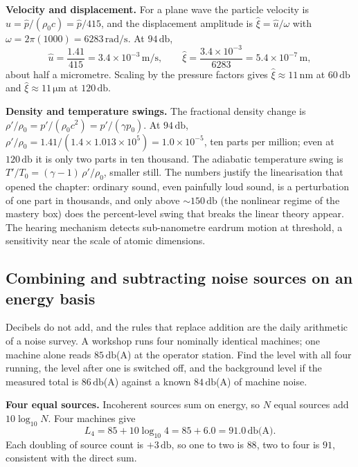\textbf{Velocity and displacement.} For a plane wave the particle velocity
is $\hat u = \hat p/(\rho_0 c) = \hat p/415$, and the displacement
amplitude is $\hat\xi = \hat u/\omega$ with $\omega = 2\pi(1000) =
6283\,\si{\radian\per\second}$. At $94\,\si{\decibel}$,
\[
\hat u = \frac{1.41}{415} = 3.4\times 10^{-3}\,\si{\meter\per\second},
\qquad
\hat\xi = \frac{3.4\times 10^{-3}}{6283} = 5.4\times 10^{-7}\,\si{\meter},
\]
about half a micrometre. Scaling by the pressure factors gives
$\hat\xi \approx 11\,\si{\nano\meter}$ at $60\,\si{\decibel}$ and
$\hat\xi \approx 11\,\si{\micro\meter}$ at $120\,\si{\decibel}$.

\textbf{Density and temperature swings.} The fractional density change is
$\rho'/\rho_0 = p'/(\rho_0 c^2) = p'/(\gamma p_0)$. At $94\,\si{\decibel}$,
$\rho'/\rho_0 = 1.41/(1.4\times 1.013\times 10^5) = 1.0\times 10^{-5}$, ten
parts per million; even at $120\,\si{\decibel}$ it is only two parts in ten
thousand. The adiabatic temperature swing is
$T'/T_0 = (\gamma-1)\,\rho'/\rho_0$, smaller still. The numbers justify the
linearisation that opened the chapter: ordinary sound, even painfully loud
sound, is a perturbation of one part in thousands, and only above
$\sim 150\,\si{\decibel}$ (the nonlinear regime of the mastery box) does
the percent-level swing that breaks the linear theory appear. The hearing
mechanism detects sub-nanometre eardrum motion at threshold, a sensitivity
near the scale of atomic dimensions.

\subsection{Combining and subtracting noise sources on an energy basis}

Decibels do not add, and the rules that replace addition are the daily
arithmetic of a noise survey. A workshop runs four nominally identical
machines; one machine alone reads $85\,\si{\decibel}$(A) at the operator
station. Find the level with all four running, the level after one is
switched off, and the background level if the measured total is
$86\,\si{\decibel}$(A) against a known $84\,\si{\decibel}$(A) of machine
noise.

\textbf{Four equal sources.} Incoherent sources sum on energy, so $N$
equal sources add $10\log_{10}N$. Four machines give
\[
L_4 = 85 + 10\log_{10}4 = 85 + 6.0 = 91.0\,\si{\decibel}\text{(A)}.
\]
Each doubling of source count is $+3\,\si{\decibel}$, so one to two is
$88$, two to four is $91$, consistent with the direct sum.

